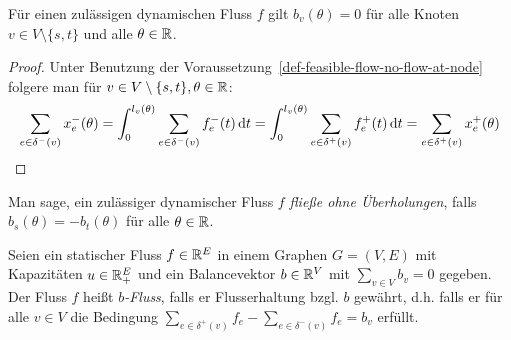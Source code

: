 \begin{lemma}\label{lemma-balance-0}
	Für einen zulässigen dynamischen Fluss $f$ gilt $b_v(\theta)=0$ für alle Knoten $v\in V\setminus\{ s,t \}$ und alle $\theta\in\mathbb{R}$.
\end{lemma}
\begin{proof}
	Unter Benutzung der Voraussetzung~\ref{def-feasible-flow-no-flow-at-node} folgere man für $v\in V\setminus \{ s, t\}, \theta\in\mathbb{R}$:
	$$\sum_{e\in\delta^-(v)} x_e^-(\theta) = \int_{0}^{l_v(\theta)} \sum_{e\in\delta^-(v)} f_e^-(t) \mathop{}\!\mathrm{d} t = \int_{0}^{l_v(\theta)} \sum_{e\in\delta^+(v)} f_e^+(t) \mathop{}\!\mathrm{d} t = \sum_{e\in\delta^+(v)}x_e^+(\theta)$$
	
\end{proof}

\begin{definition}
	Man sage, ein zulässiger dynamischer Fluss $f$ \emph{fließe ohne Überholungen}, falls $b_s(\theta) = -b_t(\theta)$ für alle $\theta\in\mathbb{R}$.
\end{definition}


\begin{definition}
	Seien ein statischer Fluss $f \in \mathbb{R}^E$ in einem Graphen $G=(V,E)$ mit Kapazitäten $u\in \mathbb{R}_+^E$ und ein Balancevektor $b\in\mathbb{R}^V$ mit $\sum_{v\in V} b_v = 0$ gegeben.
	Der Fluss $f$ heißt \emph{$b$-Fluss}, falls er Flusserhaltung bzgl. $b$ gewährt, d.h. falls er für alle $v\in V$ die Bedingung $\sum_{e\in\delta^+(v)}f_e - \sum_{e\in\delta^-(v)}f_e = b_v$ erfüllt.
\end{definition}


